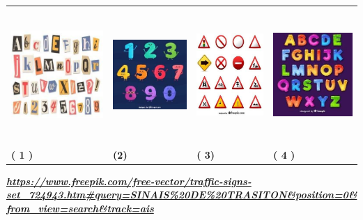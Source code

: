\begin{longtable}[]{@{}llll@{}}
\toprule
\includegraphics[width=1.51042in,height=2.00000in]{media/image183.jpg} &
\includegraphics[width=1.19792in,height=1.68472in]{media/image184.jpg} &
\includegraphics[width=1.08681in,height=1.72778in]{media/image185.jpg} &
\includegraphics[width=1.30208in,height=1.73819in]{media/image186.jpg}\tabularnewline
\textbf{( 1 )} & \textbf{(2)} & \textbf{( 3)} & \textbf{( 4
)}\tabularnewline
\bottomrule
\end{longtable}

\href{https://www.freepik.com/free-vector/traffic-signs-set_724943.htm\#query=SINAIS\%20DE\%20TRASITON\&position=0\&from_view=search\&track=ais}{\textbf{\emph{https://www.freepik.com/free-vector/traffic-signs-set\_724943.htm\#query=SINAIS\%20DE\%20TRASITON\&position=0\&from\_view=search\&track=ais}}}

